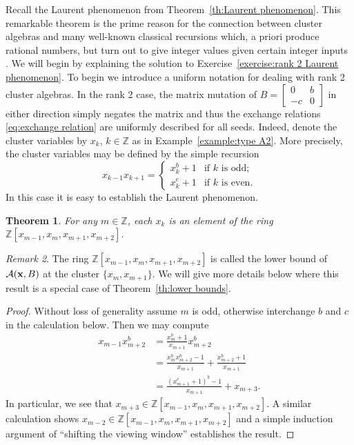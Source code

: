 \documentclass{amsart}
\newtheorem{theorem}{Theorem}[section]
\theoremstyle{definition}
\theoremstyle{remark}
\newtheorem{remark}[theorem]{Remark}
\numberwithin{equation}{section}
\newcommand{\cA}{{\mathcal{A}}}
\newcommand{\bx}{{\bf x}}
\newcommand{\ZZ}{{\mathbb{Z}}}
\begin{document}
  Recall the Laurent phenomenon from Theorem~\ref{th:Laurent phenomenon}.  This remarkable theorem is the prime reason for the connection between cluster algebras and many well-known classical recursions which, a priori produce rational numbers, but turn out to give integer values given certain integer inputs \cite{FZ02b}.  We will begin by explaining the solution to Exercise~\ref{exercise:rank 2 Laurent phenomenon}.  To begin we introduce a uniform notation for dealing with rank 2 cluster algebras.  In the rank 2 case, the matrix mutation of $B=\left[\begin{array}{cc}0 & b\\ -c & 0\end{array}\right]$  in either direction simply negates the matrix and thus the exchange relations \eqref{eq:exchange relation} are uniformly described for all seeds.  Indeed, denote the cluster variables by $x_k$, $k\in\ZZ$ as in Example~\ref{example:type A2}.  More precisely, the cluster variables may be defined by the simple recursion
  \[x_{k-1}x_{k+1}=\begin{cases}x_k^b+1 & \text{if $k$ is odd;}\\ x_k^c+1 & \text{if $k$ is even.}\end{cases}\]
  In this case it is easy to establish the Laurent phenomenon.
  \begin{theorem}
    For any $m\in\ZZ$, each $x_k$ is an element of the ring $\ZZ[x_{m-1},x_m,x_{m+1},x_{m+2}]$.
  \end{theorem}
  \begin{remark}
    The ring $\ZZ[x_{m-1},x_m,x_{m+1},x_{m+2}]$ is called the lower bound of $\cA(\bx,B)$ at the cluster $\{x_m,x_{m+1}\}$.  We will give more details below where this result is a special case of Theorem~\ref{th:lower bounds}.
  \end{remark}
  \begin{proof}
    Without loss of generality assume $m$ is odd, otherwise interchange $b$ and $c$ in the calculation below.  Then we may compute
    \begin{align*}
      x_{m-1}x_{m+2}^b
      &=\frac{x_m^b+1}{x_{m+1}}x_{m+2}^b\\
      &=\frac{x_m^bx_{m+2}^b-1}{x_{m+1}}+\frac{x_{m+2}^b+1}{x_{m+1}}\\
      &=\frac{(x_{m+1}^c+1)^b-1}{x_{m+1}}+x_{m+3}.
    \end{align*}
    In particular, we see that $x_{m+3}\in\ZZ[x_{m-1},x_m,x_{m+1},x_{m+2}]$.  A similar calculation shows $x_{m-2}\in\ZZ[x_{m-1},x_m,x_{m+1},x_{m+2}]$ and a simple induction argument of ``shifting the viewing window'' establishes the result.
  \end{proof}
\end{document}

